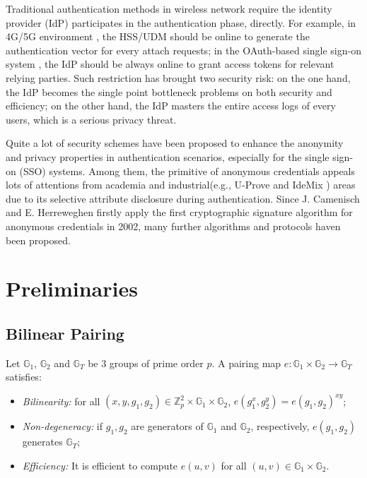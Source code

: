 \documentclass[journal]{IEEEtran}
\begin{document}
Traditional authentication methods in wireless network require the identity provider (IdP) participates in the authentication phase, directly. For example, in 4G/5G environment \cite{3gpp.33.102, 3gpp.33.401, 3gpp.33.501}, the HSS/UDM should be online to generate the authentication vector for every attach requests; in the OAuth-based single sign-on system \cite{oauth, recordon2006openid}, the IdP should be always online to grant access tokens for relevant relying parties. Such restriction has brought two security risk: on the one hand, the IdP becomes the single point bottleneck problems on both security and efficiency; on the other hand, the IdP masters the entire access logs of every users, which is a serious privacy threat. 

Quite a lot of security schemes have been proposed to enhance the anonymity and privacy properties in authentication scenarios, especially for the single sign-on (SSO) systems. Among them, the primitive of anonymous credentials appeals lots of attentions from academia and industrial(e.g., U-Prove \cite{paquin2011u} and IdeMix \cite{idemix}) areas due to its selective attribute disclosure during authentication. Since J. Camenisch and E. Herreweghen firstly apply the first cryptographic signature algorithm \cite{camenisch2002design} for anonymous credentials in 2002, many further algorithms \cite{camenisch2004signature, pointcheval2016short} and protocols \cite{elpasso, blockchain} haven been proposed.
\section{Preliminaries}
\subsection{Bilinear Pairing}
Let $\mathbb{G}_1$, $\mathbb{G}_2$ and $\mathbb{G}_T$ be 3 groups of prime order $p$. A pairing map $e:\mathbb{G}_1\times \mathbb{G}_2\rightarrow\mathbb{G}_T$ satisfies:
\begin{itemize}
	\item \textit{Bilinearity:} for all $(x,y, g_1, g_2) \in \mathbb{Z}_p^2\times \mathbb{G}_1\times \mathbb{G}_2$, $e(g_1^x, g_2^y) = e(g_1, g_2)^{xy}$;
	\item \textit{Non-degeneracy:} if $g_1, g_2$ are generators of $\mathbb{G}_1$ and $\mathbb{G}_2$, respectively, $e(g_1, g_2)$ generates $\mathbb{G}_T$;
	\item \textit{Efficiency:} It is efficient to compute $e(u,v)$ for all $(u, v) \in \mathbb{G}_1\times \mathbb{G}_2$.
\end{itemize}
\end{document}
